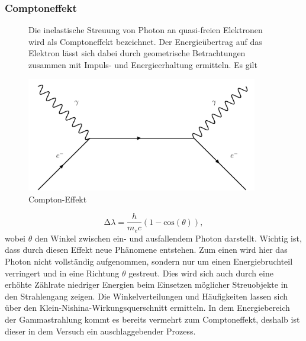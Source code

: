 \subsubsection{Comptoneffekt}
\begin{figure}
\begin{minipage}{0.5\textwidth}
Die inelastische Streuung von Photon an quasi-freien Elektronen wird als Comptoneffekt bezeichnet. 
Der Energieübertrag auf das Elektron lässt sich dabei durch geometrische Betrachtungen zusammen mit Impuls- und Energieerhaltung ermitteln. Es gilt
\end{minipage}
\begin{minipage}{0.5\textwidth}
    \centering
    \includegraphics[width=0.9\textwidth]{bilder/compton.pdf}
    \caption{Compton-Effekt}
\end{minipage}
\end{figure}


\begin{equation*}
    \increment \lambda = \frac{h}{m_e c} (1 - \text{cos}(\theta)),
\end{equation*}
wobei $\theta$ den Winkel zwischen ein- und ausfallendem Photon darstellt. 
Wichtig ist, dass durch diesen Effekt neue Phänomene entstehen. Zum einen wird hier das Photon nicht vollständig aufgenommen, sondern nur um einen Energiebruchteil verringert und in eine Richtung $\theta$ gestreut. 
Dies wird sich auch durch eine erhöhte Zählrate niedriger Energien beim Einsetzen möglicher Streuobjekte in den Strahlengang zeigen. Die Winkelverteilungen und Häufigkeiten lassen sich über den Klein-Nishina-Wirkungsquerschnitt ermitteln. 
In dem Energiebereich der Gammastrahlung kommt es bereits vermehrt zum Comptoneffekt, deshalb ist dieser in dem Versuch ein auschlaggebender Prozess.
